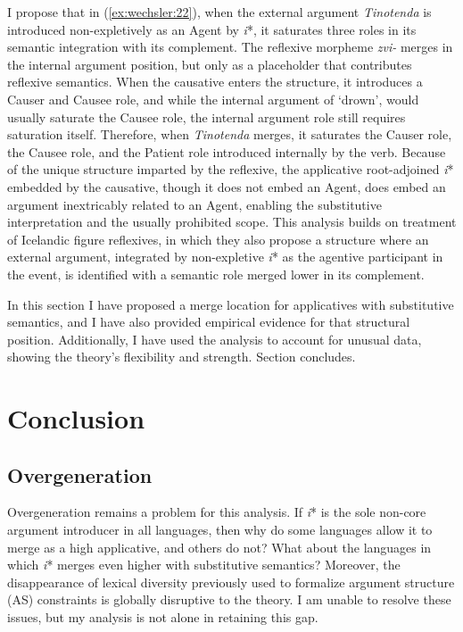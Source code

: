 \documentclass[output=paper,modfonts,nonflat,colorlinks,citecolor=brown]{langsci/langscibook}
\begin{document}
I propose that in (\ref{ex:wechsler:22}), when the external argument \textit{Tinotenda} is introduced non-expletively as an Agent by \textit{i}*, it saturates three roles in its semantic integration with its complement. The reflexive morpheme \textit{zvi-} merges in the internal argument position, but only as a placeholder that contributes reflexive semantics. When the causative enters the structure, it introduces a Causer and Causee role, and while the internal argument of ‘drown’, would usually saturate the Causee role, the internal argument role still requires saturation itself. Therefore, when \textit{Tinotenda} merges, it saturates the Causer role, the Causee role, and the Patient role introduced internally by the verb. Because of the unique structure imparted by the reflexive, the applicative root-adjoined \textit{i}* embedded by the causative, though it does not embed an Agent, does embed an argument inextricably related to an Agent, enabling the substitutive interpretation and the usually prohibited scope. This analysis builds on  treatment of Icelandic figure reflexives, in which they also propose a structure where an external argument, integrated by non-expletive \textit{i}* as the agentive participant in the event, is identified with a semantic role merged lower in its complement.


In this section I have proposed a merge location for applicatives with substitutive semantics, and I have also provided empirical evidence for that structural position. Additionally, I have used the analysis to account for unusual data, showing the theory’s flexibility and strength. Section  concludes.

\section{Conclusion}\label{sec:wechsler:4}

\subsection{Overgeneration}\label{sec:wechsler:4.1}

Overgeneration remains a problem for this analysis. If \textit{i}* is the sole non-core argument introducer in all languages, then why do some languages allow it to merge as a high applicative, and others do not? What about the languages in which \textit{i}* merges even higher with substitutive semantics? Moreover, the disappearance of lexical diversity previously used to formalize argument structure (AS) constraints is globally disruptive to the theory. I am unable to resolve these issues, but my analysis is not alone in retaining this gap.
\end{document}

